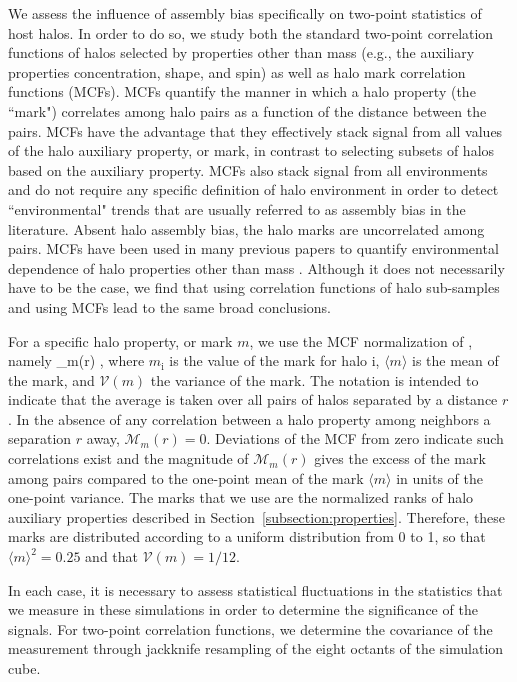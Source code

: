 \documentclass[usenatbib,fleqn]{mnras}
\begin{document}
We assess the influence of assembly bias specifically on two-point statistics of host halos. In order to do so, we 
study both the standard two-point correlation functions of halos selected by properties other than mass 
(e.g., the auxiliary properties concentration, shape, and spin) as well as halo mark correlation functions
(MCFs). MCFs quantify the manner in which a halo property (the ``mark") correlates among halo pairs as a function
of the distance between the pairs. MCFs have the advantage that they effectively stack signal from all values of 
the halo auxiliary property, or mark, in contrast to selecting subsets of halos based on the auxiliary property. 
MCFs also stack signal from all environments and do not require any specific definition of halo environment in 
order to detect ``environmental" trends that are usually referred to as assembly bias in the literature. 
Absent halo assembly bias, the halo marks are uncorrelated among pairs. 
MCFs have been used in many previous papers to quantify environmental dependence of halo 
properties other than mass \citep{sheth_tormen04,sheth05, harker_etal06,wechsler_etal06,mao_etal15}. 
Although it does not necessarily have to be the case, we find that using correlation functions of halo sub-samples 
and using MCFs lead to the same broad conclusions. 


For a specific halo property, or mark $m$, we use the MCF normalization of \citet{wechsler_etal06}, namely 
%
\beq
{}_m(r) \equiv {},
\eeq
%
where $m_{\mathrm{i}}$ is the value of the mark for halo $\mathrm{i}$, $\langle m \rangle$ is the mean of the
mark, and $\mathcal{V}(m)$ the variance of the mark. The notation is intended to indicate that the average is
taken over all pairs of halos separated by a distance $r$. In the absence of any correlation between a halo
property among neighbors a separation $r$ away, $\mathcal{M}_m(r) = 0$. Deviations of the MCF from
zero indicate such correlations exist and the magnitude of $\mathcal{M}_m(r)$ gives the excess of the mark among
pairs compared to the one-point mean of the mark $\langle m\rangle$ in units of the one-point variance. The marks that we use are the 
normalized ranks of halo auxiliary properties described in Section~\ref{subsection:properties}. Therefore, these marks are distributed according 
to a uniform distribution from 0 to 1, so that $\langle m \rangle^2 = 0.25$ and that $\mathcal{V}(m) = 1/12$. 


In each case, it is necessary to assess statistical fluctuations in the statistics that we measure in these simulations in
order to determine the significance of the signals. For two-point correlation functions, we determine the
covariance of the measurement through jackknife resampling of the eight octants of the simulation cube. 
\end{document}
